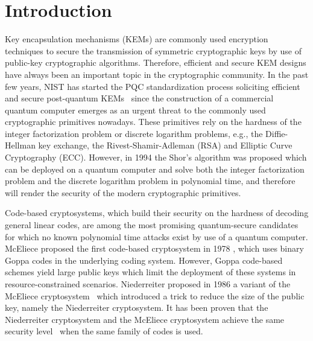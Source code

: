\documentclass[runningheads]{llncs}
\begin{document}
\section{Introduction}
Key encapsulation mechanisms (KEMs) are commonly used encryption techniques
to secure the transmission of symmetric cryptographic keys
by use of public-key cryptographic algorithms.
Therefore, efficient and secure KEM designs have always been an important topic
in the cryptographic community.
In the past few years, NIST has started the PQC standardization process
soliciting efficient and secure post-quantum KEMs~\cite{chen2016report}
since the construction of a commercial quantum computer emerges as an urgent
threat to the commonly used cryptographic primitives nowadays.
These primitives rely on the hardness of the integer factorization problem or
discrete logarithm problems, e.g., the Diffie-Hellman key exchange,
the Rivest-Shamir-Adleman (RSA) and Elliptic Curve Cryptography (ECC).
However, in 1994 the Shor's algorithm \cite{shor1997polynomial} was proposed
which can be deployed
on a quantum computer and solve both the integer factorization problem
and the discrete logarithm problem in polynomial time, and therefore will
render the security of the modern cryptographic primitives.

Code-based cryptosystems, which build their security on the hardness of
decoding general linear codes, are among the most promising quantum-secure
candidates for which no known polynomial time attacks exist by use of a quantum computer.
McEliece proposed the first code-based cryptosystem in 1978 \cite{mceliece1978public},
which uses binary Goppa codes \cite{goppa1970new} in the underlying coding system.
However, Goppa code-based schemes yield large public keys which limit
the deployment of these systems in resource-constrained scenarios.
Niederreiter proposed in 1986 a variant of the McEliece cryptosystem~\cite{niederreiter1986knapsack}
which introduced a trick to reduce the size of the public key,
namely the Niederreiter cryptosystem.
It has been proven that the Niederreiter cryptosystem and the McEliece cryptosystem
achieve the same security level~\cite{li1994equivalence} when the same family of codes is used.
\end{document}

